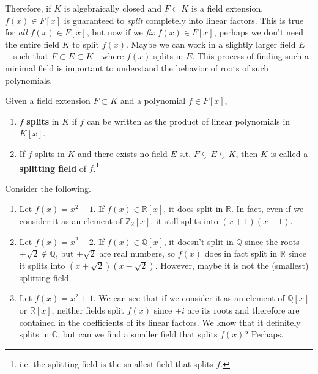   Therefore, if $K$ is algebraically closed and $F \subset K$ is a field extension, $f(x) \in F[x]$ is guaranteed to \textit{split} completely into linear factors. This is true for \textit{all} $f(x) \in F[x]$, but now if we \textit{fix} $f(x) \in F[x]$, perhaps we don't need the entire field $K$ to split $f(x)$. Maybe we can work in a slightly larger field $E$---such that $F \subset E \subset K$---where $f(x)$ splits in $E$. This process of finding such a minimal field is important to understand the behavior of roots of such polynomials. 

  \begin{definition}
    Given a field extension $F \subset K$ and a polynomial $f \in F[x]$, 
    \begin{enumerate}
      \item $f$ \textbf{splits} in $K$ if $f$ can be written as the product of linear polynomials in $K[x]$. 
      \item If $f$ splits in $K$ and there exists no field $E$ s.t. $F \subsetneq E \subsetneq K$, then $K$ is called a \textbf{splitting field} of $f$.\footnote{i.e. the splitting field is the smallest field that splits $f$.} 
    \end{enumerate}
  \end{definition}

  \begin{example}
    Consider the following. 
    \begin{enumerate}
      \item Let $f(x) = x^2 - 1$. If $f(x) \in \mathbb{R}[x]$, it does split in $\mathbb{R}$. In fact, even if we consider it as an element of $\mathbb{Z}_2 [x]$, it still splits into $(x + 1)(x - 1)$. 
      \item Let $f(x) = x^2 - 2$. If $f(x) \in \mathbb{Q}[x]$, it doesn't split in $\mathbb{Q}$ since the roots $\pm \sqrt{2} \not\in \mathbb{Q}$, but $\pm \sqrt{2}$ are real numbers, so $f(x)$ does in fact split in $\mathbb{R}$ since it splits into $(x + \sqrt{2}) (x - \sqrt{2})$. However, maybe it is not the (smallest) splitting field. 
      \item Let $f(x) = x^2 + 1$. We can see that if we consider it as an element of $\mathbb{Q}[x]$ or $\mathbb{R}[x]$, neither fields split $f(x)$ since $\pm i$ are its roots and therefore are contained in the coefficients of its linear factors. We know that it definitely splits in $\mathbb{C}$, but can we find a smaller field that splits $f(x)$? Perhaps.  
    \end{enumerate}
  \end{example}

